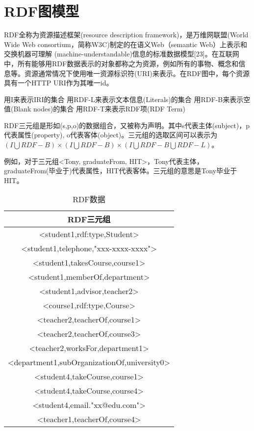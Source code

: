 \section{RDF图模型}

RDF全称为资源描述框架(resource description framework)，是万维网联盟(World Wide Web consortium，简称W3C)制定的在语义Web（semantic Web）上表示和交换机器可理解
(machine-understandable)信息的标准数据模型[23]。在互联网中，所有能够用RDF数据表示的对象都称之为资源，例如所有的事物、概念和信息等。资源通常情况下使用唯一资源标识符(URI)来表示。在RDF图中，每个资源具有一个HTTP URI作为其唯一id。

 \begin{definition}    
    用I来表示IRI的集合
    用RDF-L来表示文本信息(Literals)的集合
    用RDF-B来表示空值(Blank nodes)的集合
    用RDF-T来表示RDF项(RDF Term)
\end{definition}

\begin{definition}[（RDF三元组）]    
    RDF三元组是形如(s,p,o)的数据组合，又被称为声明。其中s代表主体(subject)，p代表属性(property),
    o代表客体(object)。三元组的选取区间可以表示为$(I\bigcup RDF-B)\times(I\bigcup RDF-B)\times(I\bigcup RDF-B\bigcup RDF-L)$。
    
    例如，对于三元组<Tony, graduateFrom, HIT>，Tony代表主体，graduateFrom(毕业于)代表属性，HIT代表客体。三元组的意思是Tony毕业于HIT。
\end{definition}

\begin{table}[htbp]
    \caption[table1]{RDF数据}
    \label{RDF1}
    \vspace{0.5em}\centering\wuhao
    \begin{tabular}{|c|}
    \toprule[1.5pt]
    RDF三元组\\
    \midrule[1pt]    
    <student1,rdf:type,Student>\\
    <student1,telephone,"xxx-xxxx-xxxx">\\
    <student1,takesCourse,course1>\\
    <student1,memberOf,department>\\
    <student1,advisor,teacher2>\\
    <course1,rdf:type,Course>\\
    <teacher2,teacherOf,course1>\\
    <teacher2,teacherOf,course3>\\
    <teacher2,worksFor,department1>\\
    <department1,subOrganizationOf,university0>\\
    <student4,takeCourse,course1>\\
    <student4,takeCourse,course4>\\
    <student4,email."xx@edu.com">\\
    <teacher1,teacherOf,course4>\\
    \bottomrule[1.5pt]
    \end{tabular}
\end{table}

